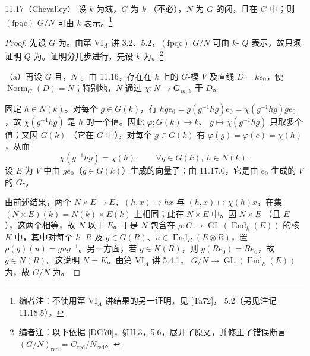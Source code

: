 \begin{SGAresult}{}{11.17（Chevalley）}
设 $k$ 为域，$G$ 为 $k$-（不必），$N$ 为 $G$ 的闭，且在 $G$ 中；则 $(\mathrm{fpqc})$  $G/N$ 可由 $k$-表示。\footnote{编者注：不使用第 VI$_A$ 讲结果的另一证明，见 [Ta72]， 5.2（另见注记 11.18.5）。}
\end{SGAresult}
\begin{proof}
先设 $G$ 为。由第 VI$_A$ 讲 3.2、5.2，$(\mathrm{fpqc})$  $G/N$ 可由 $k$- $Q$ 表示，故只须证明 $Q$ 为。证明分几步进行，先设 $k$ 为。\footnote{编者注：以下依据 [DG70]，§III.3，5.6，展开了原文，并修正了错误断言 $(G/N)_{\mathrm{red}}=G_{\mathrm{red}}/N_{\mathrm{red}}$。}

（a）再设 $G$ 且，$N$ 。由 11.16，存在在 $k$ 上的 $G$-模 $V$ 及直线 $D=ke_0$，使 $\operatorname{Norm}_G(D)=N$；特别地，$N$ 通过 $\chi:N\to\mathbf G_{m,k}$ 于 $D$。

固定 $h\in N(k)$。对每个 $g\in G(k)$，有 $hge_0=g(g^{-1}hg)e_0=\chi(g^{-1}hg)ge_0$，故 $\chi(g^{-1}hg)$ 是 $h$ 的一个值。因此 $\varphi:G(k)\to k$、
$g\mapsto\chi(g^{-1}hg)$ 只取多个值；又因 $G(k)$ （它在 $G$ 中），对每个 $g\in G(k)$ 有 $\varphi(g)=\varphi(e)=\chi(h)$，从而
\[
\chi(g^{-1}hg)=\chi(h),\qquad\forall g\in G(k),\ h\in N(k).
\]
设 $E$ 为 $V$ 中由 $ge_0$（$g\in G(k)$）生成的向量子；由 11.17.0，它是由 $e_0$ 生成的 $V$ 的 $G$-。

由前述结果，两个 $N\times E\to E$、$(h,x)\mapsto hx$ 与 $(h,x)\mapsto\chi(h)x$，在集 $(N\times E)(k)=N(k)\times E(k)$ 上相同；此在 $N\times E$ 中。因 $N\times E$ （且 $E$ ），这两个相等，故 $N$ 以于 $E$。于是 $N$ 包含在 $\rho:G\to\operatorname{GL}(\operatorname{End}_k(E))$ 的核 $K$ 中，其中对每个 $k$- $R$ 及 $g\in G(R)$、$u\in\operatorname{End}_R(E\otimes R)$，置 $\rho(g)(u)=gug^{-1}$。另一方面，若 $g\in K(R)$，则 $g(Re_0)=Re_0$，故 $g\in N(R)$。这说明 $N=K$。由第 VI$_A$ 讲 5.4.1， $G/N\to\operatorname{GL}(\operatorname{End}_k(E))$ 为，故 $G/N$ 为。


\end{proof}
